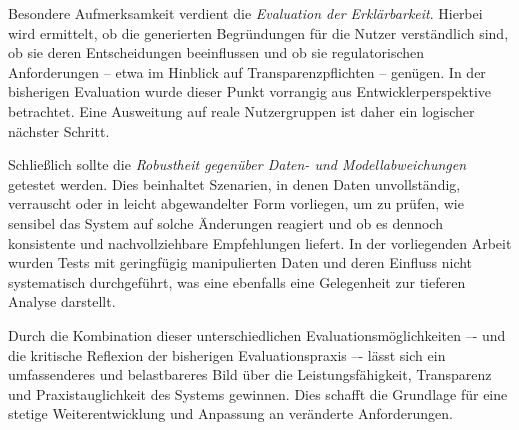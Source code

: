     Besondere Aufmerksamkeit verdient die \emph{Evaluation der Erklärbarkeit}.
    Hierbei wird ermittelt, ob die generierten Begründungen für die Nutzer verständlich sind, ob sie deren Entscheidungen beeinflussen und ob sie regulatorischen Anforderungen -- etwa im Hinblick auf Transparenzpflichten -- genügen.
    In der bisherigen Evaluation wurde dieser Punkt vorrangig aus Entwicklerperspektive betrachtet.
    Eine Ausweitung auf reale Nutzergruppen ist daher ein logischer nächster Schritt.

    Schließlich sollte die \emph{Robustheit gegenüber Daten- und Modellabweichungen} getestet werden.
    Dies beinhaltet Szenarien, in denen Daten unvollständig, verrauscht oder in leicht abgewandelter Form vorliegen, um zu prüfen, wie sensibel das System auf solche Änderungen reagiert und ob es dennoch konsistente und nachvollziehbare Empfehlungen liefert.
    In der vorliegenden Arbeit wurden Tests mit geringfügig manipulierten Daten und deren Einfluss nicht systematisch durchgeführt, was eine ebenfalls eine Gelegenheit zur tieferen Analyse darstellt.

    Durch die Kombination dieser unterschiedlichen Evaluationsmöglichkeiten –- und die kritische Reflexion der bisherigen Evaluationspraxis –- lässt sich ein umfassenderes und belastbareres Bild über die Leistungsfähigkeit, Transparenz und Praxistauglichkeit des Systems gewinnen.
    Dies schafft die Grundlage für eine stetige Weiterentwicklung und Anpassung an veränderte Anforderungen.

